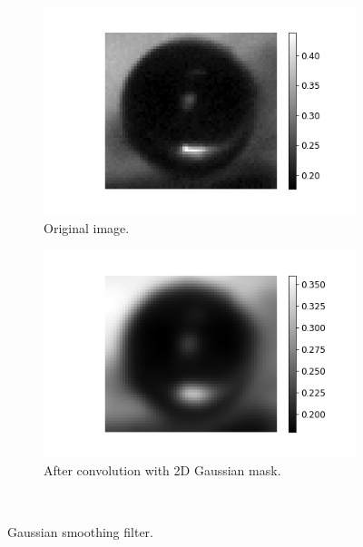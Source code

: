 \begin{figure}
		    \begin{subfigure}[t]{0.3\textwidth}
		        \includegraphics[width=\textwidth]{images/green_one.png}
		        \caption{Original image.}
		    \end{subfigure}
			  \begin{subfigure}[t]{0.3\textwidth}
		        \includegraphics[width=\textwidth]{images/green_one_gaussian.png}
		        \caption{After convolution with 2D Gaussian mask.}
		    \end{subfigure}
		    ~ %

		    \caption{Gaussian smoothing filter.}
		    \label{fig:gauss_intro}
		\end{figure}




